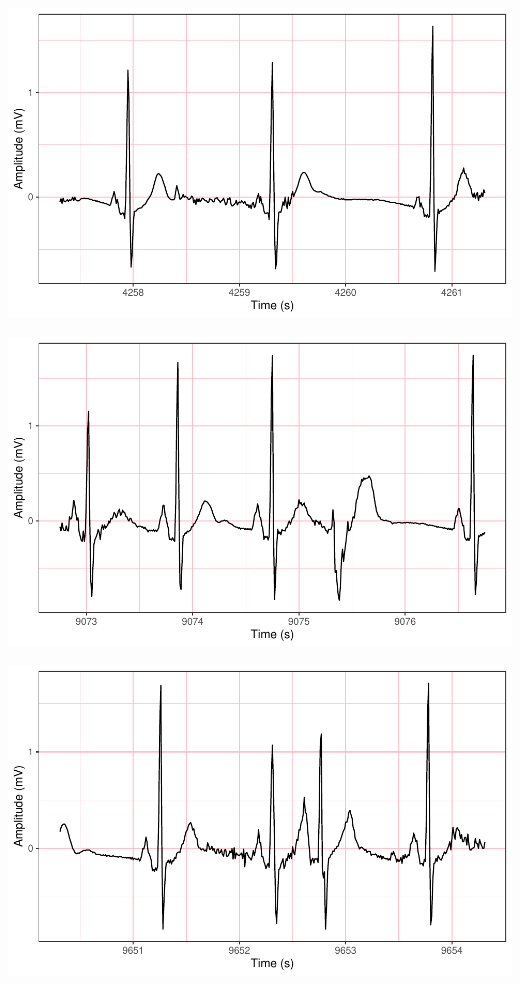 \documentclass[
]{article}
\begin{document}
\begin{center}\includegraphics{report_files/figure-latex/abnormal-interval-6} \end{center}

\begin{center}\includegraphics{report_files/figure-latex/abnormal-interval-7} \end{center}

\begin{center}\includegraphics{report_files/figure-latex/abnormal-interval-8} \end{center}
\end{document}

